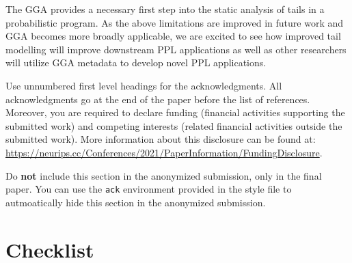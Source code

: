 \documentclass{article}
\theoremstyle{definition}
\begin{document}
The GGA provides a necessary first step into the static analysis of tails in
a probabilistic program.
As the above limitations are improved in future work and GGA becomes more broadly applicable,
we are excited to see how improved tail modelling will improve downstream PPL applications
as well as
other researchers will utilize GGA metadata to develop
novel PPL applications.

\begin{ack}
	Use unnumbered first level headings for the acknowledgments. All acknowledgments
	go at the end of the paper before the list of references. Moreover, you are required to declare
	funding (financial activities supporting the submitted work) and competing interests (related financial activities outside the submitted work).
	More information about this disclosure can be found at: \url{https://neurips.cc/Conferences/2021/PaperInformation/FundingDisclosure}.

	Do {\bf not} include this section in the anonymized submission, only in the final paper. You can use the \texttt{ack} environment provided in the style file to autmoatically hide this section in the anonymized submission.
\end{ack}




{
\small


}
\section*{Checklist}
\end{document}
